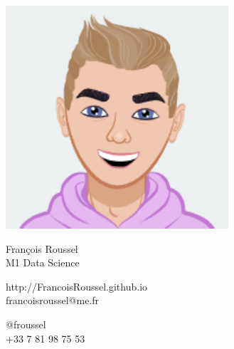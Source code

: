 \documentclass{article}
\begin{document}
\centering \includegraphics[width=.25\linewidth]{logo}\\[3pt]
\parbox{2in}{\Large \centering François Roussel\\[1pt]
\normalsize M1 Data Science}

\vfill
\raggedright
\begin{multicols}{2}
http://FrancoisRoussel.github.io\\
francoisroussel@me.fr

\columnbreak
\raggedleft
@froussel\\
+33 7 81 98 75 53%
\end{multicols}%
\end{document}
